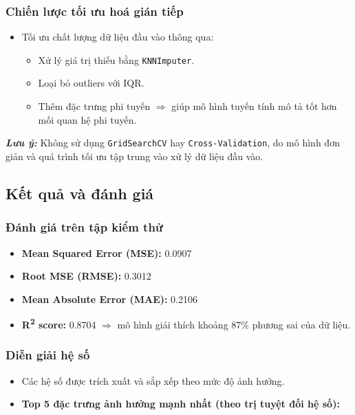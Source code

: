 \subsubsection{Chiến lược tối ưu hoá gián tiếp}
\begin{itemize}
    \item Tối ưu chất lượng dữ liệu đầu vào thông qua:
    \begin{itemize}
        \item Xử lý giá trị thiếu bằng \texttt{KNNImputer}.
        \item Loại bỏ outliers với IQR.
        \item Thêm đặc trưng phi tuyến $\Rightarrow$ giúp mô hình tuyến tính mô tả tốt hơn mối quan hệ phi tuyến.
    \end{itemize}
\end{itemize}

\noindent \textit{\textbf{Lưu ý:}} Không sử dụng \texttt{GridSearchCV} hay \texttt{Cross-Validation}, do mô hình đơn giản và quá trình tối ưu tập trung vào xử lý dữ liệu đầu vào.

\subsection{Kết quả và đánh giá}

\subsubsection{Đánh giá trên tập kiểm thử}
\begin{itemize}
    \item \textbf{Mean Squared Error (MSE):} 0.0907
    \item \textbf{Root MSE (RMSE):} 0.3012
    \item \textbf{Mean Absolute Error (MAE):} 0.2106
    \item \textbf{R\textsuperscript{2} score:} 0.8704 $\Rightarrow$ mô hình giải thích khoảng 87\% phương sai của dữ liệu.
\end{itemize}

\subsubsection{Diễn giải hệ số}
\begin{itemize}
    \item Các hệ số được trích xuất và sắp xếp theo mức độ ảnh hưởng.
    \item \textbf{Top 5 đặc trưng ảnh hưởng mạnh nhất (theo trị tuyệt đối hệ số):}
\end{itemize}

